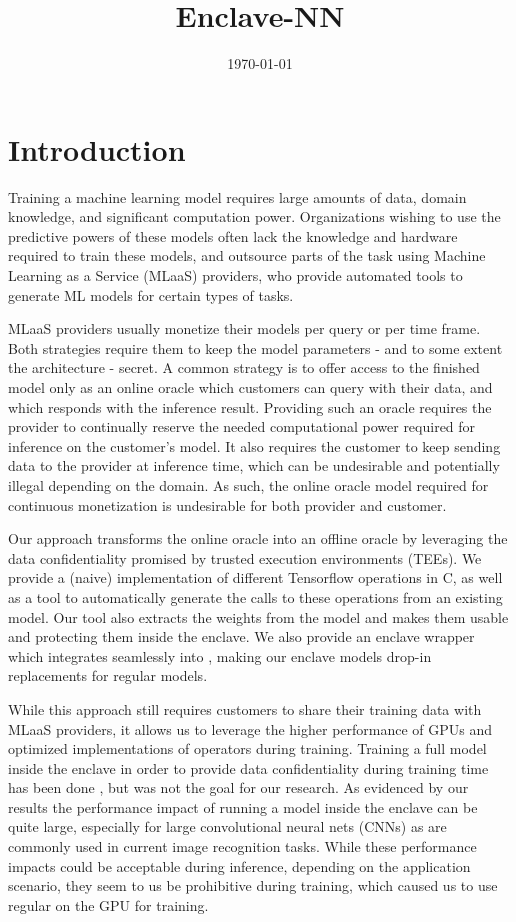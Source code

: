 \documentclass[11pt,twocolumn]{article}
\date{\today}
\title{Enclave-NN}
\begin{document}
\maketitle

\section{Introduction}
\label{sec:introduction}

Training a machine learning model requires large amounts of data, domain knowledge, and significant computation power.
Organizations wishing to use the predictive powers of these models often lack the knowledge and hardware required to train these models, and outsource parts of the task using Machine Learning as a Service (MLaaS) providers, who provide automated tools to generate ML models for certain types of tasks.

MLaaS providers usually monetize their models per query or per time frame.
Both strategies require them to keep the model parameters - and to some extent the architecture - secret.
A common strategy is to offer access to the finished model only as an online oracle which customers can query with their data, and which responds with the inference result.
Providing such an oracle requires the provider to continually reserve the needed computational power required for inference on the customer's model.
It also requires the customer to keep sending data to the provider at inference time, which can be undesirable and potentially illegal depending on the domain.
As such, the online oracle model required for continuous monetization is undesirable for both provider and customer.

Our approach transforms the online oracle into an offline oracle by leveraging the data confidentiality promised by trusted execution environments (TEEs).
We provide a (naive) implementation of different Tensorflow operations in C, as well as a tool to automatically generate the calls to these operations from an existing \tf{} model.
Our tool also extracts the weights from the model and makes them usable and protecting them inside the enclave.
We also provide an enclave wrapper which integrates seamlessly into \tf{}, making our enclave models drop-in replacements for regular \tf{} models.

While this approach still requires customers to share their training data with MLaaS providers, it allows us to leverage the higher performance of GPUs and optimized implementations of \tf{} operators during training.
Training a full model inside the enclave in order to provide data confidentiality during training time has been done \cite{ohrimenko_oblivious_2016}, but was not the goal for our research.
As evidenced by our results the performance impact of running a model inside the enclave can be quite large, especially for large convolutional neural nets (CNNs) as are commonly used in current image recognition tasks.
While these performance impacts could be acceptable during inference, depending on the application scenario, they seem to us be prohibitive during training, which caused us to use regular \tf{} on the GPU for training.
\end{document}
